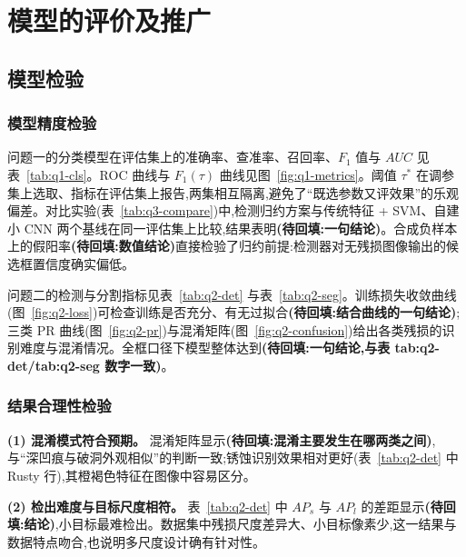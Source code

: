 %
\section{模型的评价及推广}

\subsection{模型检验}

\subsubsection{模型精度检验}

问题一的分类模型在评估集上的准确率、查准率、召回率、$F_1$ 值与 $AUC$ 见表~\ref{tab:q1-cls}。ROC 曲线与 $F_1(\tau)$ 曲线见图~\ref{fig:q1-metrics}。阈值 $\tau^{*}$ 在调参集上选取、指标在评估集上报告,两集相互隔离,避免了“既选参数又评效果”的乐观偏差。对比实验(表~\ref{tab:q3-compare})中,检测归约方案与传统特征 + SVM、自建小 CNN 两个基线在同一评估集上比较,结果表明\textbf{(待回填:一句结论)}。合成负样本上的假阳率\textbf{(待回填:数值结论)}直接检验了归约前提:检测器对无残损图像输出的候选框置信度确实偏低。

问题二的检测与分割指标见表~\ref{tab:q2-det} 与表~\ref{tab:q2-seg}。训练损失收敛曲线(图~\ref{fig:q2-loss})可检查训练是否充分、有无过拟合\textbf{(待回填:结合曲线的一句结论)};三类 PR 曲线(图~\ref{fig:q2-pr})与混淆矩阵(图~\ref{fig:q2-confusion})给出各类残损的识别难度与混淆情况。全框口径下模型整体达到\textbf{(待回填:一句结论,与表 tab:q2-det/tab:q2-seg 数字一致)}。

\subsubsection{结果合理性检验}

\textbf{(1) 混淆模式符合预期。} 混淆矩阵显示\textbf{(待回填:混淆主要发生在哪两类之间)},与“深凹痕与破洞外观相似”的判断一致;锈蚀识别效果相对更好(表~\ref{tab:q2-det} 中 Rusty 行),其橙褐色特征在图像中容易区分。

\textbf{(2) 检出难度与目标尺度相符。} 表~\ref{tab:q2-det} 中 $AP_s$ 与 $AP_l$ 的差距显示\textbf{(待回填:结论)},小目标最难检出。数据集中残损尺度差异大、小目标像素少,这一结果与数据特点吻合,也说明多尺度设计确有针对性。

